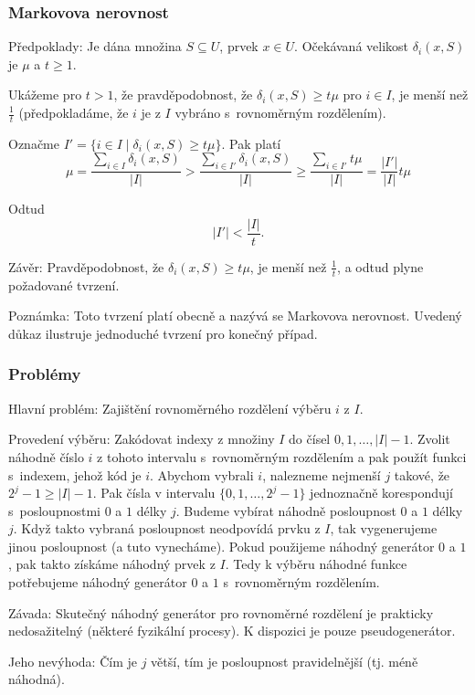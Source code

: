\documentclass[a4paper,12pt]{article}
\begin{document}
\subsubsection{Markovova nerovnost}

Předpoklady: Je dána množina $S\subseteq U$, prvek $
x\in U$. 
Očeká\-va\-ná velikost $\delta_i(x,S)$ je $\mu$ a $t\ge 
1$.

Ukážeme pro $t>1$, že pravděpodobnost, že $
\delta_i(x,S)\ge t\mu$ 
pro $i\in I$, je menší než $\frac 1t$ (předpokladáme, že $
i$ je z $I$ vybráno s~rovnoměrným rozdělením).  

Označme $I'=\{i\in I\mid\delta_i(x,S)\ge t\mu \}$. Pak platí
$$\mu =\frac {\sum_{i\in I}\delta_i(x,S)}{|I|}>\frac {\sum_{i\in 
I'}\delta_i(x,S)}{|I|}\ge\frac {\sum_{i\in I'}t\mu}{|I|}=\frac {|
I'|}{|I|}t\mu$$

Odtud
$$|I'|<\frac {|I|}t.$$

Závěr: Pravděpodobnost, že $\delta_i(x,S)\ge 
t\mu$, je menší 
než $\frac 1t$, a odtud plyne požadované tvrzení. 

Poznámka: Toto tvrzení platí obecně a nazývá 
se Markovova nerovnost. Uvedený důkaz 
ilustruje jednoduché tvrzení pro ko\-neč\-ný případ.

\subsubsection{Problémy}

Hlavní problém: Zajištění rovnoměrného rozdělení 
výběru $i$ z $I$.

Provedení výběru: Zakódovat indexy z množiny $
I$ do 
čísel $0,1,\dots,|I|-1$. Zvolit náhodně číslo $
i$ z tohoto 
intervalu s~rovnoměrným rozdělením a pak použít 
funkci s~indexem, jehož kód je $i$. Abychom vybrali $i$, nalezneme 
nejmenší $j$ takové, že $2^j-1\ge |I|-1$. Pak čísla v 
intervalu $\{0,1,\dots,2^j-1\}$ jednoznačně korespondují s~posloupnostmi $0$ a $1$ délky $j$. Budeme vybírat náhodně 
posloupnost $0$ a $1$ délky $j$. Když takto vybraná posloupnost neodpovídá prvku z $I$, tak vygenerujeme jinou posloupnost (a tuto vynecháme). Pokud použijeme náhodný generátor $0$ a $1$, pak takto získáme náhodný prvek z $I$. Tedy k výběru náhodné funkce potřebujeme  
náhodný generátor $0$ a $1$ s~rovnoměrným rozděle\-ním.

Závada: Skutečný náhodný generátor pro 
rovnoměrné rozděle\-ní je prakticky nedosažitelný 
(některé fyzikální procesy). K dispozici je pouze 
pseudogenerátor. 

Jeho nevýhoda: Čím je $j$ větší, tím je 
posloupnost pravidelnější (tj. méně náhodná). 
\end{document}
